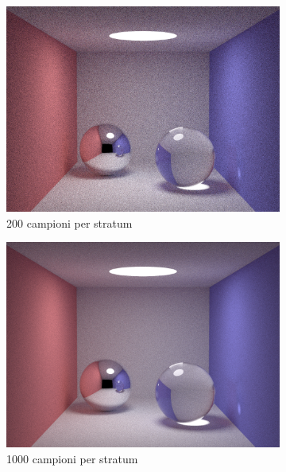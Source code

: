 \begin{figure}[p]
\begin{subfigure}[c]{0.4\linewidth}
	\includegraphics[width=\linewidth]{../assets/appendixD_result_200.png}
	\caption{200 campioni per stratum}
    \end{subfigure}\hfill
    \begin{subfigure}[c]{0.4\linewidth}
	\centering
	\includegraphics[width=\linewidth]{../assets/appendixD_result_1000.png}
	\caption{1000 campioni per stratum}
    \end{subfigure}\hfill
    \begin{subfigure}[c]{0.4\linewidth}
	\centering

\end{subfigure}
\end{figure}
